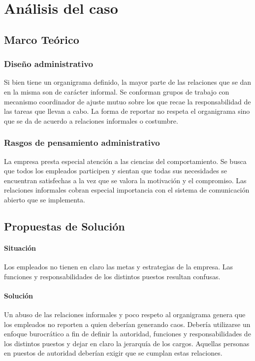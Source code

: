 \documentclass[12pt,a4paper,spanish]{article}
\begin{document}
\newpage
\section{An\'{a}lisis del caso}

\subsection{Marco Te\'orico}

\subsubsection{Dise\~{n}o administrativo}
Si bien tiene un organigrama definido, la mayor parte de las relaciones que se dan en la misma son de car\'{a}cter informal. Se conforman grupos de trabajo con mecanismo coordinador de ajuste mutuo sobre los que recae la responsabilidad de las tareas que llevan a cabo. La forma de reportar no respeta el organigrama sino que se da de acuerdo a relaciones informales o costumbre.

\subsubsection{Rasgos de pensamiento administrativo}
La empresa presta especial atenci\'{o}n a las ciencias del comportamiento. Se busca que todos los empleados participen y sientan que todas sus necesidades se encuentran satisfechas a la vez que se valora la motivaci\'{o}n y el compromiso. Las relaciones informales cobran especial importancia con el sistema de comunicaci\'{o}n abierto que se implementa.

\subsection{Propuestas de Soluci\'on}

\paragraph{Situaci\'on}
Los empleados no tienen en claro las metas y estrategias de la empresa. Las funciones y responsabilidades de los distintos puestos resultan confusas.
\paragraph{Soluci\'on}
Un abuso de las relaciones informales y poco respeto al organigrama genera que los empleados no reporten a quien deber\'{i}an generando caos. Deber\'{i}a utilizarse un enfoque burocr\'{a}tico a fin de definir la autoridad, funciones y responsabilidades de los distintos puestos y dejar en claro la jerarqu\'{i}a de los cargos. Aquellas personas en puestos de autoridad deber\'{i}an exigir que se cumplan estas relaciones.
\end{document}
